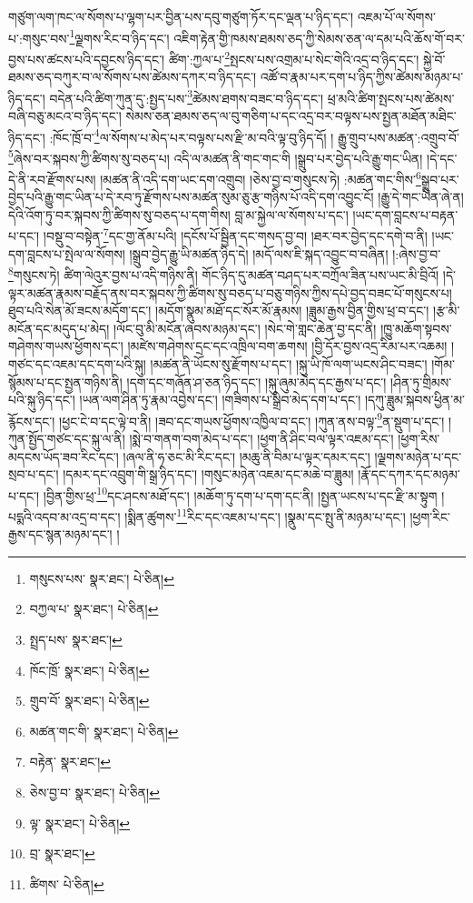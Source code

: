 གཙུག་ལག་ཁང་ལ་སོགས་པ་ལྷག་པར་བྱིན་པས་དབུ་གཙུག་ཏོར་དང་ལྡན་པ་ཉིད་དང་། འཇམ་པོ་ལ་སོགས་པ་:གསུང་བས་\footnote{གསུངས་པས་  སྣར་ཐང་།  པེ་ཅིན། }ལྗགས་རིང་བ་ཉིད་དང་། འཇིག་རྟེན་གྱི་ཁམས་ཐམས་ཅད་ཀྱི་སེམས་ཅན་ལ་དམ་པའི་ཆོས་གོ་བར་བྱས་པས་ཚངས་པའི་དབྱངས་ཉིད་དང་། ཚིག་:ཀྱལ་པ་\footnote{བཀྱལ་པ་  སྣར་ཐང་།  པེ་ཅིན། }སྤངས་པས་འགྲམ་པ་སེང་གེའི་འདྲ་བ་ཉིད་དང་། སྐྱེ་བོ་ཐམས་ཅད་བཀུར་བ་ལ་སོགས་པས་ཚེམས་དཀར་བ་ཉིད་དང་། འཚོ་བ་རྣམ་པར་དག་པ་ཉིད་ཀྱིས་ཚེམས་མཉམ་པ་ཉིད་དང་། བདེན་པའི་ཚིག་ཀུན་དུ་:སྤྱད་པས་\footnote{སྤྲད་པས་  སྣར་ཐང་། }ཚེམས་ཐགས་བཟང་བ་ཉིད་དང་། ཕྲ་མའི་ཚིག་སྤངས་པས་ཚེམས་བཞི་བཅུ་མངའ་བ་ཉིད་དང་། སེམས་ཅན་ཐམས་ཅད་ལ་བུ་གཅིག་པ་དང་འདྲ་བར་བལྟས་པས་སྤྱན་མཐོན་མཐིང་ཉིད་དང་། :ཁོང་ཁྲོ་བ་\footnote{ཁོང་ཁྲོ་  སྣར་ཐང་།  པེ་ཅིན། }ལ་སོགས་པ་མེད་པར་བལྟས་པས་རྫི་མ་བའི་ལྟ་བུ་ཉིད་དོ། །
རྒྱུ་གྲུབ་པས་མཚན་:འགྲུབ་བོ་\footnote{གྲུབ་བོ་  སྣར་ཐང་།  པེ་ཅིན། }ཞེས་བར་སྐབས་ཀྱི་ཚིགས་སུ་བཅད་པ། འདི་ལ་མཚན་ནི་གང་གང་གི །སྒྲུབ་པར་བྱེད་པའི་རྒྱུ་གང་ཡིན། །དེ་དང་དེ་ནི་རབ་རྫོགས་པས། །མཚན་ནི་འདི་དག་ཡང་དག་འགྲུབ། །ཅེས་བྱ་བ་གསུངས་ཏེ། :མཚན་གང་གིས་\footnote{མཚན་གང་གི་  སྣར་ཐང་།  པེ་ཅིན། }སྒྲུབ་པར་བྱེད་པའི་རྒྱུ་གང་ཡིན་པ་དེ་རབ་ཏུ་རྫོགས་པས་མཚན་སུམ་ཅུ་རྩ་གཉིས་པོ་འདི་དག་འབྱུང་ངོ། །རྒྱུ་དེ་གང་ཡིན་ཞེ་ན། དེའི་འོག་ཏུ་བར་སྐབས་ཀྱི་ཚིགས་སུ་བཅད་པ་དག་གིས། བླ་མ་སྐྱེལ་ལ་སོགས་པ་དང་། །ཡང་དག་བླངས་པ་བརྟན་པ་དང་། །བསྡུ་བ་བསྟེན་\footnote{བརྟེན་  སྣར་ཐང་། }དང་གྱ་ནོམ་པའི། །དངོས་པོ་སྦྱིན་དང་གསད་བྱ་བ། །ཐར་བར་བྱེད་དང་དགེ་བ་ནི། །ཡང་དག་བླངས་པ་སྤེལ་ལ་སོགས། །སྒྲུབ་བྱེད་རྒྱུ་ཡི་མཚན་ཉིད་དེ། །མདོ་ལས་ཇི་སྐད་འབྱུང་བ་བཞིན། །:ཞེས་བྱ་བ་\footnote{ཅེས་བྱ་བ་  སྣར་ཐང་།  པེ་ཅིན། }གསུངས་ཏེ། ཚིག་ལེའུར་བྱས་པ་འདི་གཉིས་ནི། གོང་ཉིད་དུ་མཚན་བཤད་པར་བཀྲོལ་ཟིན་པས་ཡང་མི་བྲིའོ། །དེ་ལྟར་མཚན་རྣམས་བརྗོད་ནས་བར་སྐབས་ཀྱི་ཚིགས་སུ་བཅད་པ་བཅུ་གཉིས་ཀྱིས་དཔེ་བྱད་བཟང་པོ་གསུངས་པ། ཐུབ་པའི་སེན་མོ་ཟངས་མདོག་དང་། །མདོག་སྣུམ་མཐོ་དང་སོར་མོ་རྣམས། །ཟླུམ་རྒྱས་བྱིན་གྱིས་ཕྲ་བ་དང་། །རྩ་མི་མངོན་དང་མདུད་པ་མེད། །ལོང་བུ་མི་མངོན་ཞབས་མཉམ་དང་། །སེང་གེ་གླང་ཆེན་བྱ་དང་ནི། །ཁྱུ་མཆོག་སྟབས་གཤེགས་གཡས་ཕྱོགས་དང་། །མཛེས་གཤེགས་དྲང་དང་འཁྲིལ་བག་ཆགས། །བྱི་དོར་བྱས་འདྲ་རིམ་པར་འཆམ། །གཙང་དང་འཇམ་དང་དག་པའི་སྐུ། །མཚན་ནི་ཡོངས་སུ་རྫོགས་པ་དང་། །སྐུ་ཡི་ཁོ་ལག་ཡངས་ཤིང་བཟང་། །གོམ་སྙོམས་པ་དང་སྤྱན་གཉིས་ནི། །དག་དང་གཞོན་ཤ་ཅན་ཉིད་དང་། །སྐུ་ཞུམ་མེད་དང་རྒྱས་པ་དང་། །ཤིན་ཏུ་གྲིམས་པའི་སྐུ་ཉིད་དང་། །ཡན་ལག་ཤིན་ཏུ་རྣམ་འབྱེས་དང་། །གཟིགས་པ་སྒྲིབ་མེད་དག་པ་དང་། །དཀུ་ཟླུམ་སྐབས་ཕྱིན་མ་རྙོངས་དང་། །ཕྱང་ངེ་བ་དང་ལྟེ་བ་ནི། །ཟབ་དང་གཡས་ཕྱོགས་འཁྱིལ་བ་དང་། །ཀུན་ནས་བལྟ་\footnote{ལྟ་  སྣར་ཐང་།  པེ་ཅིན། }ན་སྡུག་པ་དང་། །ཀུན་སྤྱོད་གཙང་དང་སྐུ་ལ་ནི། །སྨེ་བ་གནག་བག་མེད་པ་དང་། །ཕྱག་ནི་ཤིང་བལ་ལྟར་འཇམ་དང་། །ཕྱག་རིས་མདངས་ཡོད་ཟབ་རིང་དང་། །ཞལ་ནི་ཧ་ཅང་མི་རིང་དང་། །མཆུ་ནི་བིམ་པ་ལྟར་དམར་དང་། །ལྗགས་མཉེན་པ་དང་སྲབ་པ་དང་། །དམར་དང་འབྲུག་གི་སྒྲ་ཉིད་དང་། །གསུང་མཉེན་འཇམ་དང་མཆེ་བ་ཟླུམ། །རྣོ་དང་དཀར་དང་མཉམ་པ་དང་། །བྱིན་གྱིས་ཕྲ་\footnote{བྲ་  སྣར་ཐང་། }དང་ཤངས་མཐོ་དང་། །མཆོག་ཏུ་དག་པ་དག་དང་ནི། །སྤྱན་ཡངས་པ་དང་རྫི་མ་སྟུག །པདྨའི་འདབ་མ་འདྲ་བ་དང་། །སྨིན་ཚུགས་\footnote{ཚིགས་  པེ་ཅིན། }རིང་དང་འཇམ་པ་དང་། །སྣུམ་དང་སྤུ་ནི་མཉམ་པ་དང་། །ཕྱག་རིང་རྒྱས་དང་སྙན་མཉམ་དང་། །

